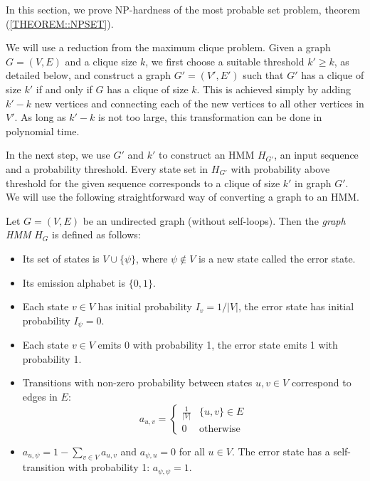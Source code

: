 
In this section, we prove NP-hardness of the most probable set problem, theorem
(\ref{THEOREM::NPSET}).

We will use a reduction from the maximum clique
problem.  Given a graph $G=(V,E)$ and a clique
size $k$, we first choose a suitable threshold $k'\ge k$, as
detailed below, and construct a graph $G'=(V',E')$ such that $G'$ has
a clique of size $k'$ if and only if $G$ has a clique of size
$k$. This is achieved simply by adding $k'-k$ new vertices and
connecting each of the new vertices to all other vertices in $V'$.
As long as $k'-k$ is not too large, this transformation can be done in
polynomial time.

In the next step, we use $G'$ and $k'$ to construct an HMM $H_{G'}$, an input
sequence and a probability threshold. Every state set in $H_{G'}$ with
probability above threshold for the given sequence corresponds to a clique of
size $k'$ in graph $G'$. We will use the following straightforward way of
converting a graph to an HMM.

\begin{definition}\label{GraphHMM}
Let $G=(V,E)$ be an undirected graph (without self-loops). 
Then the \emph{graph HMM} $H_G$ is defined as follows:
\begin{itemize}[itemsep=-1mm]
\item Its set of states is $V\cup \{\psi\}$, where $\psi\notin V$ is a
  new state called the error state.
\item Its emission alphabet is $\{0,1\}$.
\item Each state $v\in V$ has initial probability $I_{v} = 1/|V|$, the
error state has initial probability $I_{\psi}=0$.
\item Each state $v\in V$ emits 0 with probability 1, the error state emits 1 
with probability 1.
\item Transitions with non-zero probability between states $u,v\in V$
  correspond to edges in $E$:
$$a_{u,v}=\begin{cases}
\frac1{|V|} & \{u,v\}\in E\\
0 & \text{otherwise}
\end{cases}$$
\item $a_{u,\psi}=1-\sum_{v\in V}a_{u,v}$
and $a_{\psi,u}=0$ for all $u\in V$. The error state has a self-transition with
probability 1: $a_{\psi,\psi}=1$.
\end{itemize}
\end{definition}

